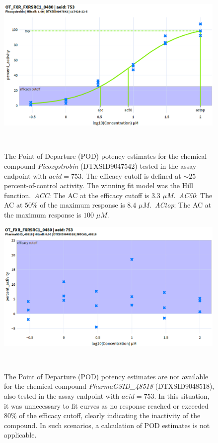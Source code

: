 \begin{figure}[h]
    \centering
    \includegraphics[width=0.99\textwidth]{figures/POD.png}
    \caption{The Point of Departure (POD) potency estimates for the chemical compound \emph{Picoxystrobin} (DTXSID9047542) tested in the assay endpoint with $aeid=753$. The efficacy cutoff is defined at $\sim25$ percent-of-control activity. The winning fit model was the Hill function.~\emph{ACC}: The AC at the efficacy cutoff is $3.3$ $\mu M$.~\emph{AC50}: The AC at $50\%$ of the maximum response is $8.4$ $\mu M$.~\emph{ACtop}: The AC at the maximum response is $100$ $\mu M$.}
~\label{fig:active_and_pod}
\end{figure}

\begin{figure}[h]
    \centering
    \includegraphics[width=0.99\textwidth]{figures/inactive_and_no_pod.png}
    \caption{The Point of Departure (POD) potency estimates are not available for the chemical compound \emph{PharmaGSID\_48518} (DTXSID9048518), also tested in the assay endpoint with $aeid=753$. In this situation, it was unnecessary to fit curves as no response reached or exceeded $80\%$ of the efficacy cutoff, clearly indicating the inactivity of the compound. In such scenarios, a calculation of POD estimates is not applicable.}
~\label{fig:inactive_and_no_pod}
\end{figure}



